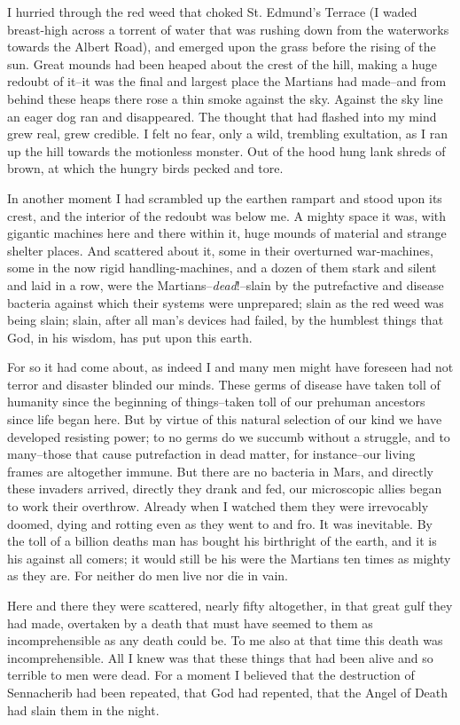 I hurried through the red weed that choked St. Edmund's Terrace (I
waded breast-high across a torrent of water that was rushing down
from the waterworks towards the Albert Road), and emerged upon the
grass before the rising of the sun. Great mounds had been heaped
about the crest of the hill, making a huge redoubt of it--it was
the final and largest place the Martians had made--and from behind
these heaps there rose a thin smoke against the sky. Against the
sky line an eager dog ran and disappeared. The thought that had
flashed into my mind grew real, grew credible. I felt no fear, only
a wild, trembling exultation, as I ran up the hill towards the
motionless monster. Out of the hood hung lank shreds of brown, at
which the hungry birds pecked and tore.

In another moment I had scrambled up the earthen rampart and stood
upon its crest, and the interior of the redoubt was below me. A
mighty space it was, with gigantic machines here and there within
it, huge mounds of material and strange shelter places. And
scattered about it, some in their overturned war-machines, some in
the now rigid handling-machines, and a dozen of them stark and
silent and laid in a row, were the Martians--\emph{dead}!--slain by
the putrefactive and disease bacteria against which their systems
were unprepared; slain as the red weed was being slain; slain,
after all man's devices had failed, by the humblest things that
God, in his wisdom, has put upon this earth.

For so it had come about, as indeed I and many men might have
foreseen had not terror and disaster blinded our minds. These germs
of disease have taken toll of humanity since the beginning of
things--taken toll of our prehuman ancestors since life began here.
But by virtue of this natural selection of our kind we have
developed resisting power; to no germs do we succumb without a
struggle, and to many--those that cause putrefaction in dead
matter, for instance--our living frames are altogether immune. But
there are no bacteria in Mars, and directly these invaders arrived,
directly they drank and fed, our microscopic allies began to work
their overthrow. Already when I watched them they were irrevocably
doomed, dying and rotting even as they went to and fro. It was
inevitable. By the toll of a billion deaths man has bought his
birthright of the earth, and it is his against all comers; it would
still be his were the Martians ten times as mighty as they are. For
neither do men live nor die in vain.

Here and there they were scattered, nearly fifty altogether, in
that great gulf they had made, overtaken by a death that must have
seemed to them as incomprehensible as any death could be. To me
also at that time this death was incomprehensible. All I knew was
that these things that had been alive and so terrible to men were
dead. For a moment I believed that the destruction of Sennacherib
had been repeated, that God had repented, that the Angel of Death
had slain them in the night.

